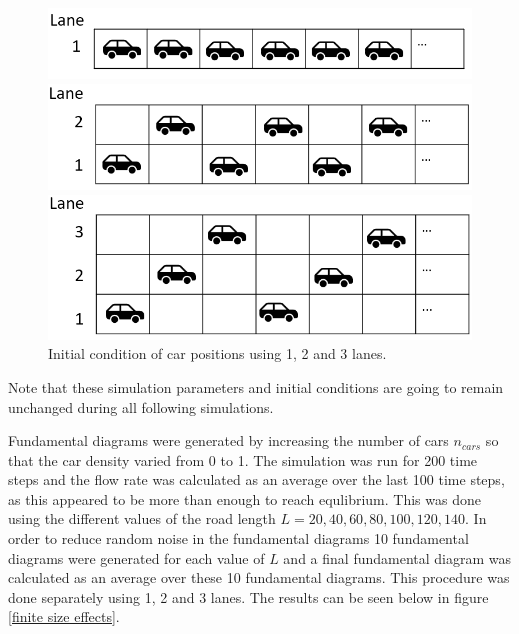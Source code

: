 \documentclass[a4paper,12pt]{article}
\begin{document}
\begin{figure}[H]
    \centering
    \begin{minipage}{1\textwidth}
        \centering
        \includegraphics[scale=0.5]{Images/ic 1 lane.png}
    \end{minipage}

    \centering
    \begin{minipage}{1\textwidth}
        \centering
        \includegraphics[scale=0.5]{Images/ic 2 lanes.png}
    \end{minipage}

    \centering
    \begin{minipage}{1\textwidth}
        \centering
        \includegraphics[scale=0.5]{Images/ic 3 lanes.png}
    \end{minipage}%
    \caption{Initial condition of car positions using 1, 2 and 3 lanes.}
    \label{initial conditions}
\end{figure}

Note that these simulation parameters and initial conditions are going to remain unchanged during all following simulations.

Fundamental diagrams were generated by increasing the number of cars $n_{cars}$ so that the car density varied from 0 to 1. 
The simulation was run for 200 time steps and the flow rate was calculated as an average over the last 100 time steps, as this appeared to be 
more than enough to reach equlibrium.
This was done using the different values of the road length $L=20, 40, 60, 80, 100, 120, 140$. In order to reduce random noise in the fundamental diagrams
10 fundamental diagrams were generated for each value of $L$ and a final fundamental diagram was calculated as an average over these 10 fundamental diagrams.
This procedure was done separately using 1, 2 and 3 lanes.
The results can be seen below in figure \ref*{finite size effects}.
\end{document}
